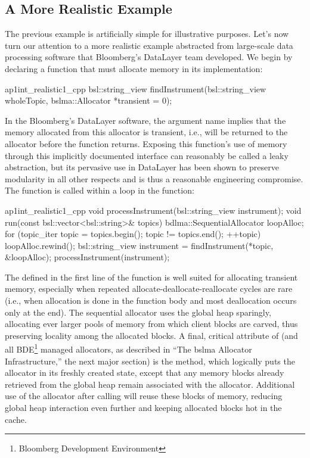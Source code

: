\subsection{A More Realistic Example}

The previous example is artificially simple for illustrative purposes. Let’s now
turn our attention to a more realistic example abstracted from large-scale data
processing software that Bloomberg’s DataLayer team developed. We begin by
declaring a function that must allocate memory in its implementation:
\begin{cppcodeblock}{ap1int_realistic1_cpp}
    bsl::string_view findInstrument(bsl::string_view wholeTopic,
    bslma::Allocator *transient = 0);
\end{cppcodeblock}
In the Bloomberg’s DataLayer software, the  argument name implies
that the memory allocated from this allocator is transient, i.e., will be returned
to the allocator before the function returns. Exposing this function’s use of
memory through this implicitly documented interface can reasonably be called
a leaky abstraction, but its pervasive use in DataLayer has been shown to
preserve modularity in all other respects and is thus a reasonable engineering
compromise. The  function is called within a loop in the 
function:
\begin{cppcodeblock}{ap1int_realistic1_cpp}
    void processInstrument(bsl::string_view instrument);
    void run(const bsl::vector<bsl::string>& topics)
    {
        bdlma::SequentialAllocator loopAlloc;
        for (topic_iter topic = topics.begin();
             topic != topics.end(); ++topic) {
             loopAlloc.rewind();
            bsl::string_view instrument = findInstrument(*topic, &loopAlloc);
            processInstrument(instrument);
        }
    }
\end{cppcodeblock}
The  defined in the first line of the  function is well
suited for allocating transient memory, especially when repeated
allocate-deallocate-reallocate cycles are rare (i.e., when allocation is done in the
function body and most deallocation occurs only at the end). The sequential
allocator uses the global heap sparingly, allocating ever larger pools of memory
from which client blocks are carved, thus preserving locality among the
allocated blocks. A final, critical attribute of  (and all
BDE\footnote{Bloomberg Development Environment} managed allocators, as described in “The bslma Allocator Infrastructure,”
the next major section) is the  method, which logically puts the allocator
in its freshly created state, except that any memory blocks already retrieved
from the global heap remain associated with the allocator. Additional use of the
allocator after calling  will reuse these blocks of memory, reducing
global heap interaction even further and keeping allocated blocks hot in the
cache.

